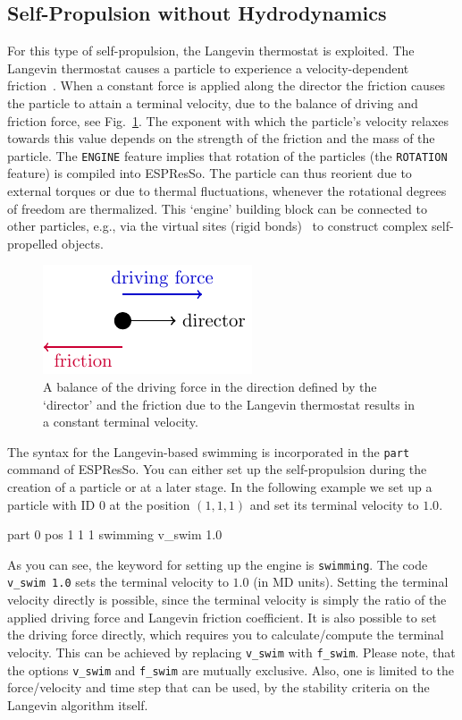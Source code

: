 \documentclass[aip,jcp,reprint,a4paper,onecolumn,amsmath]{revtex4-1}
\newcommand\code{\lstinline}
\newcommand{\es}{\mbox{\textsf{ESPResSo}}\xspace}
\newcommand\codees{\lstinline[language=espresso]}
\begin{document}
\subsection{\label{sub:langevin}Self-Propulsion without Hydrodynamics}

For this type of self-propulsion, the Langevin thermostat is exploited. The Langevin thermostat causes a particle to experience a velocity-dependent friction~\cite{UG}. When a constant force is applied along the director the friction causes the particle to attain a terminal velocity, due to the balance of driving and friction force, see Fig.~\ref{fig:balance}. The exponent with which the particle's velocity relaxes towards this value depends on the strength of the friction and the mass of the particle. The \code{ENGINE} feature implies that rotation of the particles (the \code{ROTATION} feature) is compiled into \es{}. The particle can thus reorient due to external torques or due to thermal fluctuations, whenever the rotational degrees of freedom are thermalized. This `engine' building block can be connected to other particles, e.g., via the virtual sites (rigid bonds)~\cite{UG} to construct complex self-propelled objects.

\begin{figure}[!htb]
\begin{center}
\includegraphics[scale=1.0]{FIGURES/friction}
\end{center}
\caption{\label{fig:balance}A balance of the driving force in the direction defined by the `director' and the friction due to the Langevin thermostat results in a constant terminal velocity.}
\end{figure}

The syntax for the Langevin-based swimming is incorporated in the \codees{part} command of \es{}. You can either set up the self-propulsion during the creation of a particle or at a later stage. In the following example we set up a particle with ID 0 at the position $(1,1,1)$ and set its terminal velocity to $1.0$.
\begin{espresso}
part 0 pos 1 1 1 swimming v_swim 1.0
\end{espresso}
As you can see, the keyword for setting up the engine is \codees{swimming}. The code \codees{v_swim 1.0} sets the terminal velocity to $1.0$ (in MD units). Setting the terminal velocity directly is possible, since the terminal velocity is simply the ratio of the applied driving force and Langevin friction coefficient. It is also possible to set the driving force directly, which requires you to calculate/compute the terminal velocity. This can be achieved by replacing \codees{v_swim} with \codees{f_swim}. Please note, that the options \codees{v_swim} and \codees{f_swim} are mutually exclusive. Also, one is limited to the force/velocity and time step that can be used, by the stability criteria on the Langevin algorithm itself.
\end{document}
